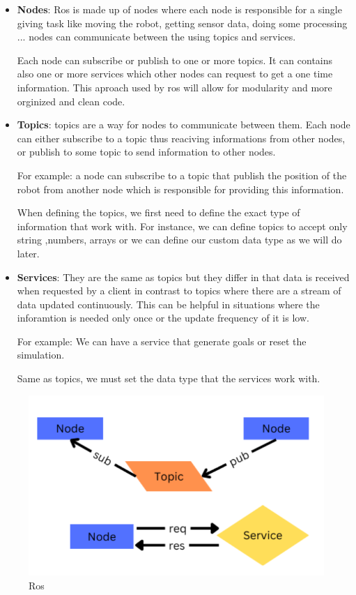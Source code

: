 \documentclass[12pt]{extarticle}
\begin{document}
\begin{itemize}
\item \textbf{Nodes}: Ros is made up of nodes where  each node     is responsible for a single giving task like moving the robot, getting sensor data, doing some processing ... \linebreak
nodes can communicate between the using topics and services.

Each node can subscribe or publish  to one or more topics. It can contains also one or more services which other nodes can request to get a one time information. This aproach used by ros will allow for modularity and more orginized and clean code.

     



\item \textbf{Topics}: topics are a way for nodes to communicate between them. Each node can either subscribe to a topic thus reaciving informations from other nodes, or publish to some topic to send information to other nodes.

For example: a node can subscribe to a topic that publish the position of the robot  from another node which is responsible for providing this information.

When defining the topics, we first need to define the exact type of information that work with. For instance, we can define topics to accept only string ,numbers, arrays or we can define our custom data type as we will do later.


\item \textbf{Services}:  They are the same as topics but they differ in that data is received when requested by a client in contrast to topics where there are a stream of data updated continuously. This can be helpful in situations where the inforamtion is needed only once or the update frequency of it is low.
 


For example: We can have a service that generate goals or reset the simulation.

Same as topics, we  must set the data type that the services work with.


\end{itemize}
 

 
 \begin{figure}[h]  
\centering
\includegraphics[scale=0.4]{ros}
\caption[Ros]{Ros}
\end{figure}
\pagebreak
\end{document}
